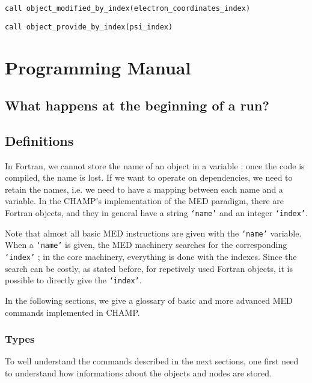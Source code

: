 \documentclass[a4paper,11pt]{article}
\begin{document}
\vspace{0.5cm}
\noindent
{\tt call object_modified_by_index(electron_coordinates_index)}

\vspace{0.5cm}
\noindent
{\tt call object_provide_by_index(psi_index)}


\section{Programming Manual}

\subsection{What happens at the beginning of a run?}

\subsection{Definitions}

In Fortran, we cannot store the name of an object in a variable : once the code is compiled, the name is lost.
If we want to operate on dependencies, we need to retain the names, i.e. we need to have a mapping between each name and a variable.
In the CHAMP's implementation of the MED paradigm, there are Fortran objects, and they in general have a string {\tt `name'} and an integer {\tt `index'}.

Note that almost all basic MED instructions are given with the {\tt `name'} variable.
When a {\tt `name'} is given, the MED machinery searches for the corresponding {\tt `index'} ; in the core machinery, everything is done with the indexes.
Since the search can be costly, as stated before, for repetively used Fortran objects, it is possible to directly give the {\tt `index'}.

In the following sections, we give a glossary of basic and more advanced MED commands implemented in CHAMP.

\subsubsection{Types}

To well understand the commands described in the next sections, one first need to understand how informations about the objects and nodes are stored.
\end{document}
